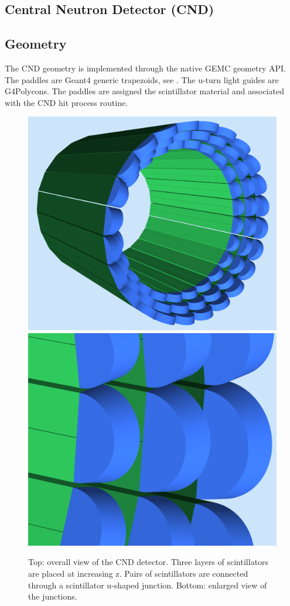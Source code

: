 \subsection{Central Neutron Detector (CND)}

\subsection{Geometry}

The CND geometry is implemented through the native GEMC geometry API.
The paddles are Geant4 generic trapezoids, see . The u-turn light guides are G4Polycons.
The paddles are assigned the scintillator material and associated with the CND hit process routine.

\begin{figure}
	\centering
	\includegraphics[width=0.95\columnwidth,keepaspectratio]{img/cndGeometry.png}
	\includegraphics[width=0.95\columnwidth,keepaspectratio]{img/cndDetail.png}
	\caption{Top: overall view of the CND detector. Three layers of scintillators are placed at increasing z. Pairs of scintillators
            are connected through a scintillator u-shaped junction. Bottom: enlarged view of the junctions. }
	\label{fig:cndGeometry}
\end{figure}


